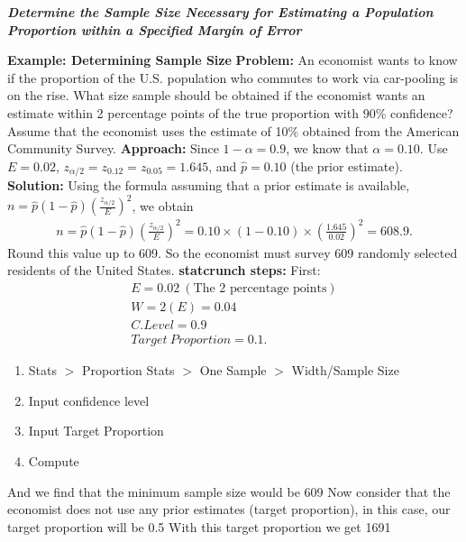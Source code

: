 \documentclass{report}
\begin{document}
     \bigbreak \noindent \bigbreak \noindent 
     \textbf{\textit{Determine the Sample Size Necessary for Estimating a Population Proportion within a Specified Margin of Error}}
     \pagebreak \bigbreak \noindent 
     \begin{mdframed}
       \textbf{Example: Determining Sample Size}
       \bigbreak \noindent 
       \textbf{Problem:}
       An economist wants to know if the proportion of the U.S. population who commutes to work via car-pooling is on the rise. What size sample should be obtained if the economist wants an estimate within 2 percentage points of the true proportion with 90\% confidence?
       \bigbreak \noindent 
       Assume that the economist uses the estimate of 10\% obtained from the American Community Survey.
       \bigbreak \noindent 
       \textbf{Approach:}
       Since \(1 - \alpha = 0.9\), we know that \(\alpha = 0.10\). Use \(E = 0.02\), \(z_{\alpha/2} = z_{0.12} = z_{0.05} = 1.645\), and \(\hat{p} = 0.10\) (the prior estimate).
       \bigbreak \noindent 
       \textbf{Solution:}
       Using the formula assuming that a prior estimate is available, \(n = \hat{p}(1 - \hat{p})\left(\frac{z_{\alpha/2}}{E}\right)^2\), we obtain
       \begin{align*}
           n = \hat{p}(1 - \hat{p})\left(\frac{z_{\alpha/2}}{E}\right)^2 = 0.10 \times (1 - 0.10) \times \left(\frac{1.645}{0.02}\right)^2 = 608.9 
       .\end{align*}
       Round this value up to 609. So the economist must survey 609 randomly selected residents of the United States.
       \bigbreak \noindent 
       \textbf{statcrunch steps:}
       \bigbreak \noindent 
       First:
       \begin{align*}
           E = 0.02\ (\text{The 2 percentage points}) \\
           W = 2(E) = 0.04 \\
           C.Level = 0.9 \\
           Target\ Proportion = 0.1
       .\end{align*}
       \begin{enumerate}
           \item Stats $>$ Proportion Stats $>$ One Sample $> $ Width/Sample Size
            \item Input confidence level
            \item Input Target Proportion
            \item Compute
       \end{enumerate}
       \bigbreak \noindent 
       And we find that the minimum sample size would be 609
       \bigbreak \noindent 
       Now consider that the economist does not use any prior estimates (target proportion), in this case, our target proportion will be 0.5
       \bigbreak \noindent 
       With this target proportion we get 1691
     \end{mdframed}































    
\end{document}
